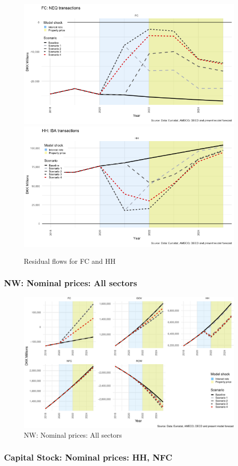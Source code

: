 \documentclass[
]{book}
\begin{document}
\begin{figure}[H]
\includegraphics[width=0.5\linewidth]{figures/fl-fi-sfc-passive-FC-HH-1} \includegraphics[width=0.5\linewidth]{figures/fl-fi-sfc-passive-FC-HH-2} \caption{Residual flows for FC and HH}\label{fig:fl-fi-sfc-passive-FC-HH}
\end{figure}

\hypertarget{nw-nominal-prices-all-sectors}{%
\subsubsection{NW: Nominal prices: All sectors}\label{nw-nominal-prices-all-sectors}}

\begin{figure}
\centering
\includegraphics{figures/fl-fi-sfc-plot-fnw-1.pdf}
\caption{\label{fig:fl-fi-sfc-plot-fnw}NW: Nominal prices: All sectors}
\end{figure}

\hypertarget{capital-stock-nominal-prices-hh-nfc}{%
\subsubsection{Capital Stock: Nominal prices: HH, NFC}\label{capital-stock-nominal-prices-hh-nfc}}
\end{document}
